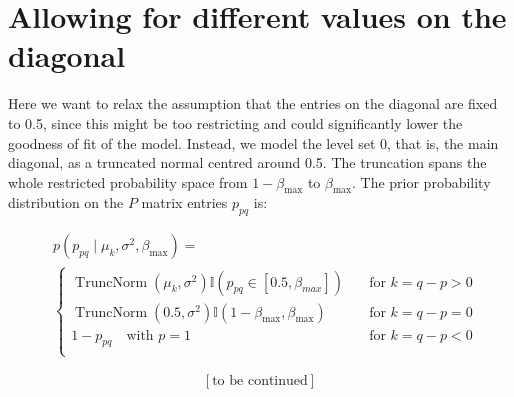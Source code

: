 \documentclass[11pt]{amsart}
\begin{document}
\section{Allowing for different values on the diagonal}

Here we want to relax the assumption that the entries on the diagonal are fixed to 0.5, since this might be too restricting and could significantly lower the goodness of fit of the model. Instead, we model the level set 0, that is, the main diagonal, as a truncated normal centred around 0.5. The truncation spans the whole restricted probability space from $1-\beta_{\max}$ to $\beta_{\max}$.
The prior probability distribution on the $P$ matrix entries $p_{pq}$ is:

\begin{align}
&p \left(p_{pq} \mid \mu_{k}, \sigma^2, \beta_{\max} \right) = \\
&\begin{cases}
\operatorname{TruncNorm}\left(\mu_{k}, \sigma^2\right) \mathbb{I}\left(p_{pq} \in \left[0.5,\beta_{max}\right]\right) \quad  &\text{for } k= q-p >0\\
\operatorname{TruncNorm}\left(0.5, \sigma^2\right) \mathbb{I}\left(1 - \beta_{\max},\beta_{\max}\right) &\text{for } k= q-p =0\\
1-p_{pq} \quad \text{with } p=1 &\text{for } k= q-p <0\\
\end{cases}
\end{align}


$$\left[\text{to be continued}\right]$$
\end{document}
